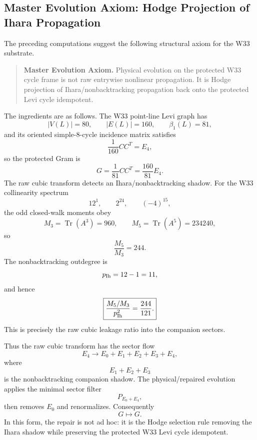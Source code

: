 
\subsection{Master Evolution Axiom: Hodge Projection of Ihara Propagation}\label{subsec:master-evolution-axiom}

The preceding computations suggest the following structural axiom for the W33
substrate.

\begin{quote}
\textbf{Master Evolution Axiom.}
Physical evolution on the protected W33 cycle frame is not raw entrywise
nonlinear propagation.  It is Hodge projection of Ihara/nonbacktracking
propagation back onto the protected Levi cycle idempotent.
\end{quote}

The ingredients are as follows.  The W33 point-line Levi graph has
\[
|V(L)|=80,\qquad |E(L)|=160,\qquad \beta_1(L)=81,
\]
and its oriented simple-$8$-cycle incidence matrix satisfies
\[
\frac1{160}CC^T=E_4,
\]
so the protected Gram is
\[
G=\frac1{81}CC^T=\frac{160}{81}E_4.
\]
The raw cubic transform detects an Ihara/nonbacktracking shadow.  For the W33
collinearity spectrum
\[
12^1,\qquad 2^{24},\qquad (-4)^{15},
\]
the odd closed-walk moments obey
\[
M_3=\operatorname{Tr}(A^3)=960,\qquad
M_5=\operatorname{Tr}(A^5)=234240,
\]
so
\[
\frac{M_5}{M_3}=244.
\]
The nonbacktracking outdegree is
\[
p_{\rm Ih}=12-1=11,
\]
and hence
\[
\boxed{
\frac{M_5/M_3}{p_{\rm Ih}^2}=\frac{244}{121}.
}
\]
This is precisely the raw cubic leakage ratio into the companion sectors.

Thus the raw cubic transform has the sector flow
\[
E_4\longrightarrow E_0+E_1+E_2+E_3+E_4,
\]
where
\[
E_1+E_2+E_3
\]
is the nonbacktracking companion shadow.  The physical/repaired evolution applies
the minimal sector filter
\[
P_{E_0+E_4},
\]
then removes $E_0$ and renormalizes.  Consequently
\[
G\longmapsto G.
\]
In this form, the repair is not ad hoc: it is the Hodge selection rule removing
the Ihara shadow while preserving the protected W33 Levi cycle idempotent.
